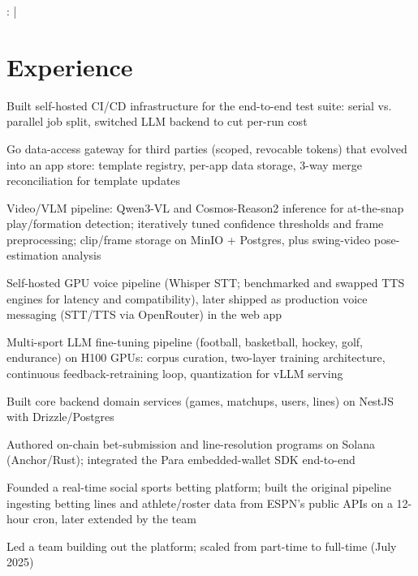 \documentclass[print]{jack-resume}
\begin{document}
\raggedright{
    :
      \href{https://www.linkedin.com/in/jack-sturtevant/}{ \ExternalLink} |
     \href{https://github.com/jacksturt}{ \ExternalLink}}


\section{Experience}

\begin{tightemize}
    \item Built self-hosted CI/CD infrastructure for the end-to-end test suite: serial vs. parallel job split, switched LLM backend to cut per-run cost
    \item Go data-access gateway for third parties (scoped, revocable tokens) that evolved into an app store: template registry, per-app data storage, 3-way merge reconciliation for template updates
    \item Video/VLM pipeline: Qwen3-VL and Cosmos-Reason2 inference for at-the-snap play/formation detection; iteratively tuned confidence thresholds and frame preprocessing; clip/frame storage on MinIO + Postgres, plus swing-video pose-estimation analysis
    \item Self-hosted GPU voice pipeline (Whisper STT; benchmarked and swapped TTS engines for latency and compatibility), later shipped as production voice messaging (STT/TTS via OpenRouter) in the web app
    \item Multi-sport LLM fine-tuning pipeline (football, basketball, hockey, golf, endurance) on H100 GPUs: corpus curation, two-layer training architecture, continuous feedback-retraining loop, quantization for vLLM serving
\end{tightemize}
\sectionsep

\begin{tightemize}
    \item Built core backend domain services (games, matchups, users, lines) on NestJS with Drizzle/Postgres
    \item Authored on-chain bet-submission and line-resolution programs on Solana (Anchor/Rust); integrated the Para embedded-wallet SDK end-to-end
    \item Founded a real-time social sports betting platform; built the original pipeline ingesting betting lines and athlete/roster data from ESPN's public APIs on a 12-hour cron, later extended by the team
    \item Led a team building out the platform; scaled from part-time to full-time (July 2025)
\end{tightemize}
\sectionsep
\end{document}
